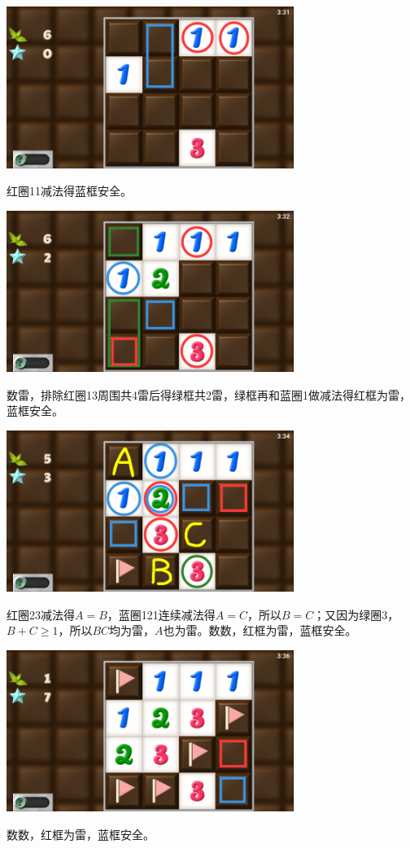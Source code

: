 \subsection{} %
\begin{center}
    \includegraphics[width=0.7\textwidth]{puzzle/159-1.png}
\end{center}
红圈11减法得蓝框安全。
\begin{center}
    \includegraphics[width=0.7\textwidth]{puzzle/159-2.png}
\end{center}
数雷，排除红圈13周围共4雷后得绿框共2雷，绿框再和蓝圈1做减法得红框为雷，蓝框安全。
\begin{center}
    \includegraphics[width=0.7\textwidth]{puzzle/159-3.png}
\end{center}
红圈23减法得$A=B$，蓝圈121连续减法得$A=C$，所以$B=C$；又因为绿圈3，$B+C\ge 1$，所以$BC$均为雷，$A$也为雷。数数，红框为雷，蓝框安全。
\begin{center}
    \includegraphics[width=0.7\textwidth]{puzzle/159-4.png}
\end{center}
数数，红框为雷，蓝框安全。


